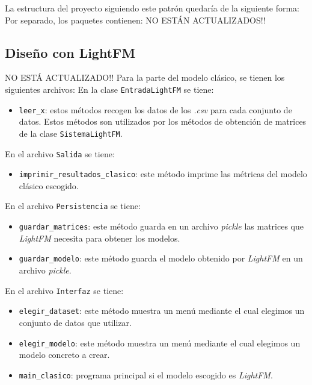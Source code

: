 
La estructura del proyecto siguiendo este patrón quedaría de la siguiente forma:
Por separado, los paquetes contienen:
NO ESTÁN ACTUALIZADOS!!

\subsection{Diseño con LightFM}\label{diseño-lightfm}
NO ESTÁ ACTUALIZADO!!
Para la parte del modelo clásico, se tienen los siguientes archivos:
En la clase \texttt{EntradaLightFM} se tiene:
\begin{itemize}
\tightlist
\item \texttt{leer\_x}: estos métodos recogen los datos de los \textit{.csv} para cada conjunto de datos. Estos métodos son utilizados por los métodos de obtención de matrices de la clase \texttt{SistemaLightFM}.
\end{itemize}

En el archivo \texttt{Salida} se tiene:
\begin{itemize}
\tightlist
\item \texttt{imprimir\_resultados\_clasico}: este método imprime las métricas del modelo clásico escogido.
\end{itemize}

En el archivo \texttt{Persistencia} se tiene:
\begin{itemize}
\tightlist
\item \texttt{guardar\_matrices}: este método guarda en un archivo \textit{pickle} las matrices que \textit{LightFM} necesita para obtener los modelos.
\item \texttt{guardar\_modelo}: este método guarda el modelo obtenido por \textit{LightFM} en un archivo \textit{pickle}.
\end{itemize}

En el archivo \texttt{Interfaz} se tiene:
\begin{itemize}
\tightlist
\item \texttt{elegir\_dataset}: este método muestra un menú mediante el cual elegimos un conjunto de datos que utilizar.
\item \texttt{elegir\_modelo}: este método muestra un menú mediante el cual elegimos un modelo concreto a crear. 
\item \texttt{main\_clasico}: programa principal si el modelo escogido es \textit{LightFM}. 
\end{itemize}


